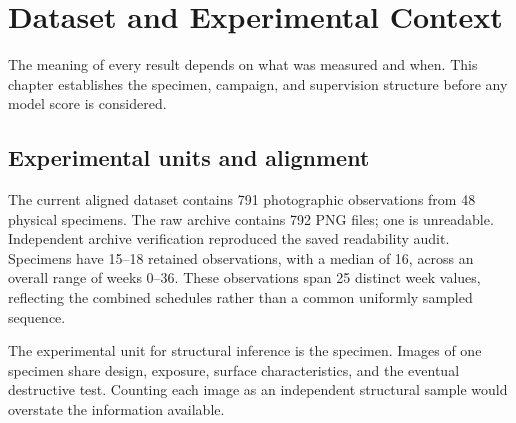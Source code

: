 \chapter{Dataset and Experimental Context}\label{ch:data}
The meaning of every result depends on what was measured and when. This chapter establishes the specimen, campaign, and supervision structure before any model score is considered.

\section{Experimental units and alignment}
The current aligned dataset contains 791 photographic observations from 48 physical specimens. The raw archive contains 792 PNG files; one is unreadable. Independent archive verification reproduced the saved readability audit. Specimens have 15--18 retained observations, with a median of 16, across an overall range of weeks 0--36. These observations span 25 distinct week values, reflecting the combined schedules rather than a common uniformly sampled sequence.

The experimental unit for structural inference is the specimen. Images of one specimen share design, exposure, surface characteristics, and the eventual destructive test. Counting each image as an independent structural sample would overstate the information available.



